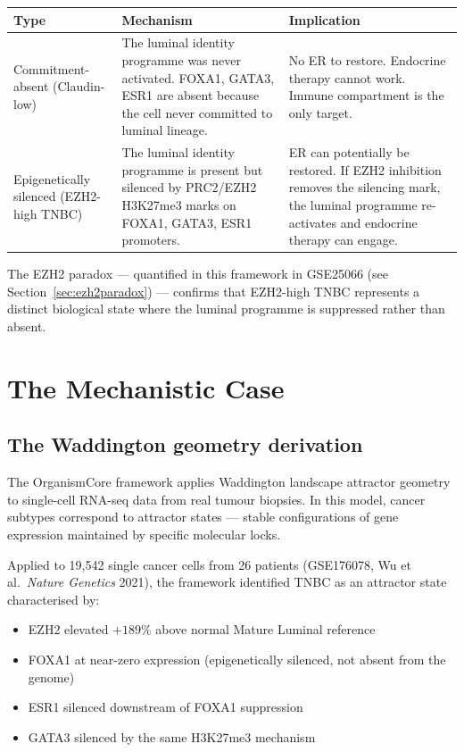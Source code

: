 \documentclass[12pt, a4paper]{article}
\begin{document}
\begin{center}
\begin{tabular}{p{3cm}p{5.5cm}p{5cm}}
\toprule
\textbf{Type} & \textbf{Mechanism} & \textbf{Implication} \\
\midrule
Commitment-absent
(Claudin-low)
& The luminal identity programme was
  never activated. FOXA1, GATA3,
  ESR1 are absent because the cell
  never committed to luminal lineage.
& No ER to restore.
  Endocrine therapy cannot work.
  Immune compartment is the only target. \\[0.5em]
Epigenetically
silenced
(EZH2-high TNBC)
& The luminal identity programme is
  present but silenced by PRC2/EZH2
  H3K27me3 marks on FOXA1, GATA3,
  ESR1 promoters.
& ER can potentially be restored.
  If EZH2 inhibition removes the
  silencing mark, the luminal
  programme re-activates and
  endocrine therapy can engage. \\
\bottomrule
\end{tabular}
\end{center}

The EZH2 paradox --- quantified in this framework in
GSE25066 (see Section~\ref{sec:ezh2paradox}) --- confirms
that EZH2-high TNBC represents a distinct biological
state where the luminal programme is suppressed rather
than absent.

\section{The Mechanistic Case}

\subsection{The Waddington geometry derivation}

The OrganismCore framework applies Waddington landscape
attractor geometry to single-cell RNA-seq data from real
tumour biopsies. In this model, cancer subtypes correspond
to attractor states --- stable configurations of gene
expression maintained by specific molecular locks.

Applied to 19,542 single cancer cells from 26 patients
(GSE176078, Wu et al.\ \textit{Nature Genetics} 2021),
the framework identified TNBC as an attractor state
characterised by:

\begin{itemize}[noitemsep]
  \item EZH2 elevated $+189\%$ above normal Mature
        Luminal reference
  \item FOXA1 at near-zero expression (epigenetically
        silenced, not absent from the genome)
  \item ESR1 silenced downstream of FOXA1 suppression
  \item GATA3 silenced by the same H3K27me3 mechanism
\end{itemize}
\end{document}
